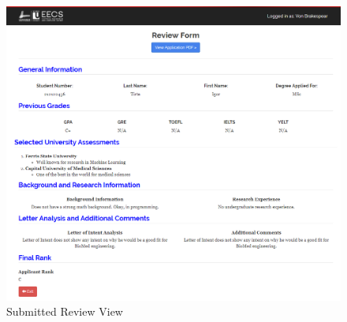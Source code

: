 \documentclass[fontsize=12pt,paper=letter,twoside]{scrartcl}
\begin{document}
\begin{figure}[!htb]
\begin{center}
\includegraphics[width=.7\textwidth]{images/submit_review_view.png}
\end{center}
\caption{Submitted Review View}
\label{fig:submit_review_view}
\end{figure}
\end{document}

